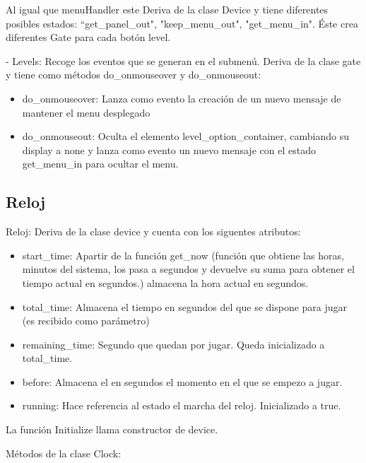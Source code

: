 Al igual que menuHandler este Deriva de la clase Device  y tiene diferentes posibles estados:
“get\_panel\_out", "keep\_menu\_out", "get\_menu\_in".
Éste crea diferentes Gate para cada botón level.

- Levels: Recoge los eventos que se generan en el submenú. 
Deriva de la clase gate y tiene como métodos do\_onmouseover y do\_onmouseout:

\begin{itemize}
 \item do\_onmouseover: Lanza como evento la creación de un nuevo mensaje de mantener el menu desplegado

 \item do\_onmouseout: Oculta el elemento level\_option\_container, cambiando su display a none y lanza como evento un nuevo mensaje con el estado 
get\_menu\_in para ocultar el menu.
\end{itemize}


\subsection{Reloj}
\label{subsection:reloj}

Reloj: Deriva de la clase device y cuenta con los siguentes atributos:

\begin{itemize}
 \item start\_time: Apartir de la función get\_now (función que obtiene las horas, minutos del sistema, los pasa a segundos y devuelve su suma para 
obtener el tiempo actual en segundos.) almacena la hora actual en segundos.
 \item total\_time: Almacena el tiempo en segundos del que se dispone para jugar (es recibido como parámetro)
 \item remaining\_time: Segundo que quedan por jugar. Queda inicializado a total\_time.
 \item before: Almacena el en segundos el momento en el que se empezo a jugar.
 \item running: Hace referencia al estado el marcha del reloj. Inicializado a true.
\end{itemize}

La función Initialize llama constructor de device.

Métodos de la clase Clock:

